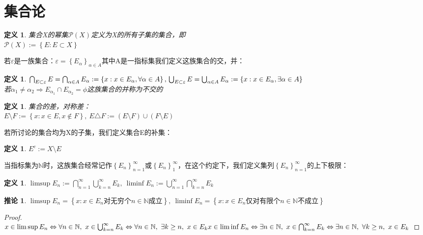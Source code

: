 \documentclass[12pt, a4paper, oneside]{ctexbook}
\newtheorem{definition}[theorem]{定义}
\newtheorem{corollary}[theorem]{推论}
\begin{document}
\section{集合论}
\begin{definition}
    集合X的幂集$\mathcal{P}(X)$定义为X的所有子集的集合，即\\$\mathcal{P}(X):=\left\{E:E\subset X\right\}$
\end{definition}
若$\varepsilon$是一族集合：$\varepsilon=\left\{E_\alpha\right\}_{\alpha\in A}$其中A是一指标集我们定义这族集合的交，并：
\begin{definition}
    $\bigcap_{E\subset\varepsilon}E=\bigcap_{\alpha\in A}E_\alpha:=\left\{x:x\in E_\alpha ,\forall\alpha\in A\right\},\\
    \bigcup_{E\subset\varepsilon}E=\bigcup_{\alpha\in A}E_\alpha:=\left\{x:x\in E_\alpha,\exists\alpha\in A\right\}$\\
    若$\alpha_1\neq\alpha_2\Rightarrow E_{\alpha_1}\cap E_{\alpha_2}=\phi$这族集合的并称为不交的
\end{definition}
\begin{definition}
    集合的差，对称差：\\$E\setminus F:=\left\{{x:x\in E,x\notin F}\right\},\ E\triangle F:=(E\setminus F)\cup(F\setminus E)$
\end{definition}
若所讨论的集合均为X的子集，我们定义集合E的补集：
\begin{definition}
    $E^c:=X\setminus E$
\end{definition}
当指标集为$\mathbb{N}$时，这族集合经常记作$\left\{E_n\right\}_{n=1}^{\infty}$或$\left\{E_n\right\}_{1}^{\infty}$，在这个约定下，我们定义集列$\left\{E_n\right\}_{n=1}^\infty$的上下极限：
\begin{definition}
    $\limsup E_n:=\bigcap_{n=1}^\infty\bigcup_{k=n}^\infty E_k,\ \liminf E_n:=\bigcup_{n=1}^\infty\bigcap_{k=n}^\infty E_k$
\end{definition}
\begin{corollary}
    $\limsup E_n=\left\{x:x\in E_n\text{对无穷个$n\in\mathbb{N}$成立}\right\},\ \liminf E_n=\left\{x:x\in E_n\text{仅对有限个$n\in\mathbb{N}$不成立}\right\}$
\end{corollary}
\begin{proof}
    $x\in\limsup E_n\\
    \Leftrightarrow\forall n\in\mathbb{N},\ x\in\bigcup_{k=n}^\infty E_k\\
    \Leftrightarrow\forall n\in\mathbb{N},\ \exists k\geq n,\ x\in E_k\\
    x\in\liminf E_n\\
    \Leftrightarrow\exists n\in\mathbb{N},\ x\in\bigcap_{k=n}^\infty E_k\\
    \Leftrightarrow\exists n\in\mathbb{N},\ \forall k\geq n,\ x\in E_k$
\end{proof}
\end{document}
